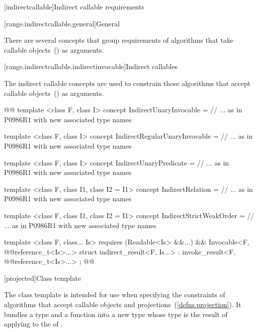 





[indirectcallable]{Indirect callable requirements}

[range.indirectcallable.general]{General}

\pnum
There are several concepts that group requirements of algorithms that take callable
objects~() as arguments.

[range.indirectcallable.indirectinvocable]{Indirect callables}

\pnum
The indirect callable concepts are used to constrain those algorithms that accept
callable objects~() as arguments.

%
%
%
%
%
%
\begin{codeblock}
@@
  template <class F, class I>
  concept IndirectUnaryInvocable = // ... as in P0986R1 with new associated type names

  template <class F, class I>
  concept IndirectRegularUnaryInvocable = // ... as in P0986R1 with new associated type names

  template <class F, class I>
  concept IndirectUnaryPredicate = // ... as in P0986R1 with new associated type names

  template <class F, class I1, class I2 = I1>
  concept IndirectRelation = // ... as in P0986R1 with new associated type names

  template <class F, class I1, class I2 = I1>
  concept IndirectStrictWeakOrder = // ... as in P0986R1 with new associated type names

  template <class F, class... Is>
    requires (Readable<Is> &&...) && Invocable<F, @@reference_t<Is>...>
  struct indirect_result<F, Is...> :
    invoke_result<F, @@reference_t<Is>...> { };
@\added{\}}@
\end{codeblock}

[projected]{Class template }

\pnum
The  class template is intended for use when specifying the constraints of
algorithms that accept callable objects and projections~(\ref{defns.projection}). It bundles a  type
 and a function  into a new  type whose
 type is the result of applying  to the
 of .

